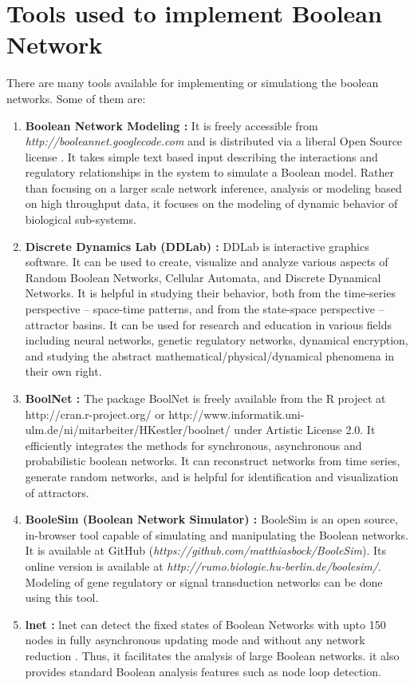 \documentclass[11pt]{report}
\begin{document}
    \section{Tools used to implement Boolean Network}
    There are many tools available for implementing or simulationg the boolean networks.
    Some of them are:
    \begin{enumerate}
     \item \textbf{Boolean Network Modeling : } It is freely accessible from \emph{http://booleannet.googlecode.com} and is distributed via a liberal Open Source license \cite{Albert2008}.
     It takes simple text based input describing the interactions and regulatory relationships in the system to simulate a Boolean model.
     Rather than focusing on a larger scale network inference, analysis or modeling based on high throughput data, it focuses on the modeling of dynamic behavior of biological sub-systems.
    \item \textbf{Discrete Dynamics Lab (DDLab) : } DDLab is interactive graphics software.\cite{Wuensche2008}
    It can be used to create, visualize and analyze various aspects of Random Boolean Networks, Cellular Automata, and Discrete Dynamical Networks.
    It is helpful in studying their behavior, both from the time-series perspective – space-time patterns, and from the state-space perspective – attractor basins.
    It can be used for research and education in various fields including neural networks, genetic regulatory networks, dynamical encryption, and studying the abstract mathematical/physical/dynamical phenomena in their own right.
    \item \textbf{BoolNet : } The package BoolNet is freely available from the R project at http://cran.r-project.org/ or http://www.informatik.uni- ulm.de/ni/mitarbeiter/HKestler/boolnet/ under Artistic License 2.0. \cite{Mussel2010}
    It efficiently integrates the methods for synchronous, asynchronous and probabilistic boolean networks.
    It can reconstruct networks from time series, generate random networks, and is helpful for identification and visualization of attractors.
    \item \textbf{BooleSim (Boolean Network Simulator) : } BooleSim is an open source, in-browser tool capable of simulating and manipulating the Boolean networks\cite{Bock2013}.
    It is available at GitHub (\emph{https://github.com/matthiasbock/BooleSim}).
    Its online version is available at \emph{http://rumo.biologie.hu-berlin.de/boolesim/}.
    Modeling of gene regulatory or signal transduction networks can be done using this tool.
    \item \textbf{lnet : } lnet can detect the fixed states of Boolean Networks with upto 150 nodes in fully asynchronous updating mode and without any network reduction \cite{Berntenis2013}.
    Thus, it facilitates the analysis of large Boolean networks.
    it also provides standard Boolean analysis features such as node loop detection.
    
    \end{enumerate}


 
 
\end{document}
